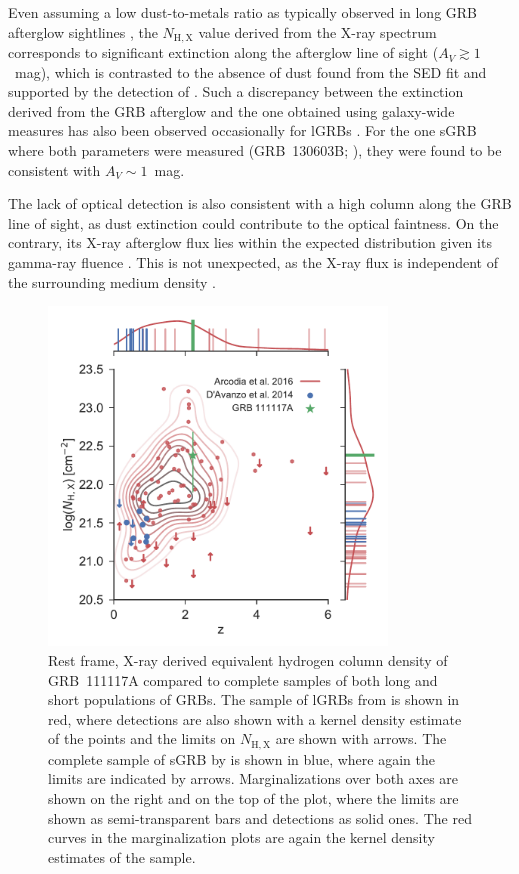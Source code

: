 \documentclass{aa}    %
\begin{document}
Even assuming a low dust-to-metals ratio as typically observed in long GRB
afterglow sightlines \citep{Galama2001, Schady2010, Covino2013}, the
$N_\mathrm{H,X}$ value derived from the X-ray spectrum corresponds to
significant extinction along the afterglow line of sight ($A_V \gtrsim 1$~mag),
which is contrasted to the absence of dust found from the SED fit and supported
by the detection of \lya{}. Such a discrepancy between the extinction derived
from the GRB afterglow and the one obtained using galaxy-wide measures has also
been observed occasionally for lGRBs \citep{Perley2013a}. For the one sGRB where
both parameters were measured (GRB~130603B; \citealt{DeUgartePostigo2014d}),
they were found to be consistent with $A_V \sim 1$~mag.

The lack of optical detection is also consistent with a high column along the
GRB line of sight, as dust extinction could contribute to the optical faintness.
On the contrary, its X-ray afterglow flux lies within the expected distribution
given its gamma-ray fluence \citep{DAvanzo2014a}. This is not unexpected, as the
X-ray flux is independent of the surrounding medium density \citep{Freedman2001,
	Berger2003, Nysewander2009}.

\begin{figure}
	\centering \includegraphics[width=9cm]{figures/NH_z.pdf} \caption{Rest frame,
	X-ray derived equivalent hydrogen column density of GRB~111117A compared to
	complete samples of both long and short populations of GRBs. The sample of
	lGRBs from \citet{Arcodia2016} is shown in red, where detections are also shown
	with a kernel density estimate of the points and the limits on $N_\mathrm{H,X}$
	are shown with arrows. The complete sample of sGRB by \citet{DAvanzo2014a} is
	shown in blue, where again the limits are indicated by arrows. Marginalizations
	over both axes are shown on the right and on the top of the plot, where the
	limits are shown as semi-transparent bars and detections as solid ones. The red
	curves in the marginalization plots are again the kernel density estimates of
	the \citet{Arcodia2016} sample.} \label{fig:NH_z}
\end{figure}
\end{document}
